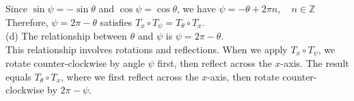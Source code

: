 \documentclass{article}
\begin{document}
Since $\sin\psi = -\sin\theta$ and $\cos\psi = \cos\theta$, we have $\psi = -\theta + 2\pi n, \quad n \in \mathbb{Z}$ \\

Therefore, $\psi = 2\pi - \theta$ satisfies $T_x \circ T_{\psi} = T_{\theta} \circ T_x$. \\

(d) The relationship between $\theta$ and $\psi$ is $\psi = 2\pi - \theta$. \\

This relationship involves rotations and reflections. When we apply $T_x \circ T_{\psi}$, we rotate counter-clockwise by angle $\psi$ first, then reflect across the $x$-axis. The result equals $T_{\theta} \circ T_x$, where we first reflect across the $x$-axis, then rotate counter-clockwise by $2\pi - \psi$.
\end{document}

